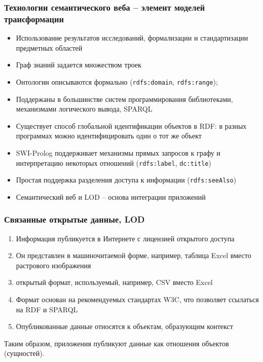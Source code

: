 \documentclass[10pt]{beamer}
\begin{document}
\begin{frame}[fragile]
  \frametitle{Технологии семантического веба -- элемент моделей трансформации}
  \begin{itemize}
  \item Использование результатов исследований, формализации и стандартизации предметных областей
  \item Граф знаний задается множеством троек
  \item Онтологии описываются формально (\verb|rdfs:domain|, \verb|rdfs:range|);
  \item Поддержаны в большинстве систем программирования библиотеками, механизмами логического вывода, SPARQL
  \item Существует способ глобальной идентификации объектов в RDF: в разных программах можно идентифицировать один о тот же объект
  \item SWI-Prolog поддерживает механизмы прямых запросов к графу и интерпретацию некоторых отношений (\verb|rdfs:label|, \verb|dc:title|)
  \item Простая поддержка разделения доступа к информации (\verb|rdfs:seeAlso|)
  \item Семантический веб и LOD -- основа интеграции приложений
  \end{itemize}
\end{frame}

\begin{frame}
\frametitle{Связанные открытые данные, LOD}
\begin{enumerate}
\item  Информация публикуется в Интернете с лицензией открытого доступа
\item  Он представлен в машиночитаемой форме, например, таблица Excel вместо растрового изображения
\item  открытый формат, используемый, например, CSV вместо Excel
\item  Формат основан на рекомендуемых стандартах W3C, что позволяет ссылаться на RDF и SPARQL
\item Опубликованные данные относятся к объектам, образующим контекст
\end{enumerate}
Таким образом, приложения публикуют данные как отношения объектов (сущностей).
\end{frame}
\end{document}
